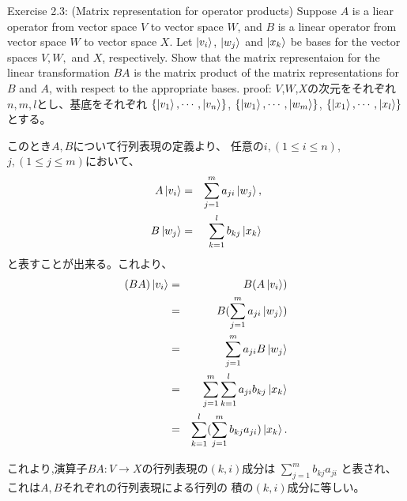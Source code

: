 \setcounter{equation}{0}
\begin{flushleft}
{\Large Exercise 2.3: (Matrix representation for operator products)}
\newline
Suppose $A$ is a liear operator from vector space $V$ to vector space $W$,
and $B$ is a linear operator from vector space $W$ to vector space $X$.
Let $\ket{v_i}$, $\ket{w_j}$ and $\ket{x_k}$ be bases 
for the vector spaces $V, W,$ and $X$, respectively.
\newline
Show that the matrix representaion for the linear transformation 
$BA$ is the matrix product of the matrix representations for $B$ and $A$, 
with respect to the appropriate bases.
\vspace{0.1in}
\newline
{\large proof:}
\newline
$V$,$W$,$X$の次元をそれぞれ$n, m, l$とし、基底をそれぞれ
$\{\ket{v_1}, \cdots, \ket{v_n}\}$,
$\{\ket{w_1}, \cdots, \ket{w_m}\}$,
$\{\ket{x_1}, \cdots, \ket{x_l}\}$とする。

このとき$A, B$について行列表現の定義より、
任意の$i, (1\leq i\leq n)$, $j, (1\leq j\leq m)$において、
\begin{eqnarray}
A\ket{v_i} &=& \sum_{j=1}^m a_{ji} \ket{w_j}, \\
B\ket{w_j} &=& \sum_{k=1}^l b_{kj} \ket{x_k}
\end{eqnarray}
と表すことが出来る。これより、
\begin{eqnarray*}
(BA)\ket{v_i}
&=& B(A\ket{v_i}) \\
&=& B(\sum_{j=1}^m a_{ji} \ket{w_j}) \\
&=& \sum_{j=1}^m a_{ji} B\ket{w_j} \\
&=& \sum_{j=1}^m \sum_{k=1}^l a_{ji} b_{kj} \ket{x_k} \\
&=& \sum_{k=1}^l (\sum_{j=1}^m b_{kj} a_{ji}) \ket{x_k}.
\end{eqnarray*}

これより,演算子$BA:V \to X$の行列表現の$(k, i)$成分は
$\sum_{j=1}^m b_{kj} a_{ji}$ と表され、これは$A, B$それぞれの行列表現による行列の
積の$(k, i)$成分に等しい。
\end{flushleft}
